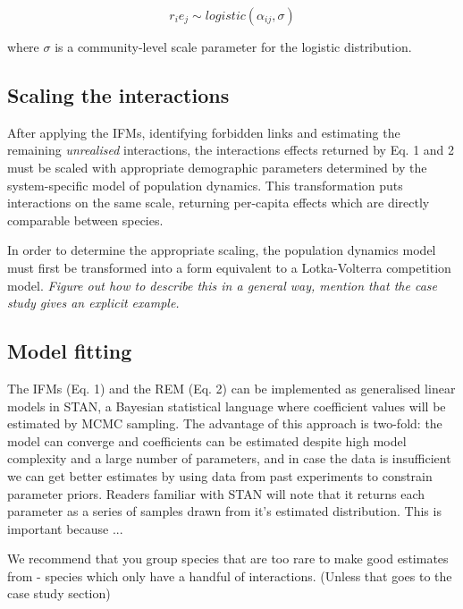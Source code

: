 \documentclass[a4,12pt]{article}
\begin{document}
        \begin{equation}
        r_i e_j \sim logistic \left ( \alpha_{ij}, \sigma \right )
        \label{unrealised}
        \end{equation}
    
    where $\sigma$ is a community-level scale parameter for the logistic distribution. 
        
        \subsection{Scaling the interactions}
        
        After applying the IFMs, identifying forbidden links and estimating the remaining \textit{unrealised} interactions, the interactions effects returned by Eq. 1 and 2 must be scaled with appropriate demographic parameters determined by the system-specific model of population dynamics. This transformation puts interactions on the same scale, returning per-capita effects which are directly comparable between species. 
        
        In order to determine the appropriate scaling, the population dynamics model must first be transformed into a form equivalent to a Lotka-Volterra competition model. \textit{Figure out how to describe this in a general way, mention that the case study gives an explicit example.}
        
        \subsection{Model fitting}
        
        The IFMs (Eq. 1) and the REM (Eq. 2) can be implemented as generalised linear models in STAN, a Bayesian statistical language where coefficient values will be estimated by MCMC sampling. The advantage of this approach is two-fold: the model can converge and coefficients can be estimated despite high model complexity and a large number of parameters, and in case the data is insufficient we can get better estimates by using data from past experiments to constrain parameter priors. Readers familiar with STAN will note that it returns each parameter as a series of samples drawn from it's estimated distribution. This is important because ...

        We recommend that you group species that are too rare to make good estimates from - species which only have a handful of interactions. (Unless that goes to the case study section)
    
\end{document}
